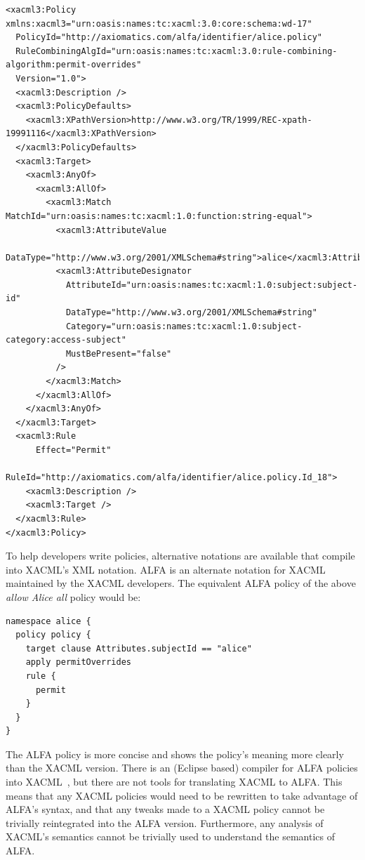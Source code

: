 \documentclass[thesis.tex]{subfiles}
\begin{document}
\noindent\begin{minipage}{\linewidth}
\begin{lstlisting}
<xacml3:Policy xmlns:xacml3="urn:oasis:names:tc:xacml:3.0:core:schema:wd-17"
  PolicyId="http://axiomatics.com/alfa/identifier/alice.policy"
  RuleCombiningAlgId="urn:oasis:names:tc:xacml:3.0:rule-combining-algorithm:permit-overrides"
  Version="1.0">
  <xacml3:Description />
  <xacml3:PolicyDefaults>
    <xacml3:XPathVersion>http://www.w3.org/TR/1999/REC-xpath-19991116</xacml3:XPathVersion>
  </xacml3:PolicyDefaults>
  <xacml3:Target>
    <xacml3:AnyOf>
      <xacml3:AllOf>
        <xacml3:Match MatchId="urn:oasis:names:tc:xacml:1.0:function:string-equal">
          <xacml3:AttributeValue
            DataType="http://www.w3.org/2001/XMLSchema#string">alice</xacml3:AttributeValue>
          <xacml3:AttributeDesignator 
            AttributeId="urn:oasis:names:tc:xacml:1.0:subject:subject-id"
            DataType="http://www.w3.org/2001/XMLSchema#string"
            Category="urn:oasis:names:tc:xacml:1.0:subject-category:access-subject"
            MustBePresent="false"
          />
        </xacml3:Match>
      </xacml3:AllOf>
    </xacml3:AnyOf>
  </xacml3:Target>
  <xacml3:Rule 
      Effect="Permit"
      RuleId="http://axiomatics.com/alfa/identifier/alice.policy.Id_18">
    <xacml3:Description />
    <xacml3:Target />
  </xacml3:Rule>
</xacml3:Policy>
\end{lstlisting}
\end{minipage}

To help developers write policies, alternative notations are available that
compile into XACML's XML notation. ALFA is an alternate notation for
XACML~\cite{oasis_xacml_technical_comitee_abbreviated_2015} maintained by the
XACML developers. The equivalent ALFA policy of the above \emph{allow Alice all}
policy would be:

\noindent\begin{minipage}{\linewidth}
\begin{lstlisting}
namespace alice {
  policy policy {
    target clause Attributes.subjectId == "alice"
    apply permitOverrides
    rule {
      permit
    }
  }
}
\end{lstlisting}
\end{minipage}

The ALFA policy is more concise and shows the
policy's meaning more clearly than the XACML version.
There is an (Eclipse based) compiler for ALFA policies into
XACML~\cite{axiomaics_axiomatics_2012}, but there are not tools for
translating XACML to ALFA.  This means that any XACML policies would
need to be rewritten to take advantage of ALFA's syntax, and that any
tweaks made to a XACML policy cannot be trivially reintegrated into
the ALFA version.  Furthermore, any analysis of XACML's semantics cannot
be trivially used to understand the semantics of ALFA.
\end{document}
